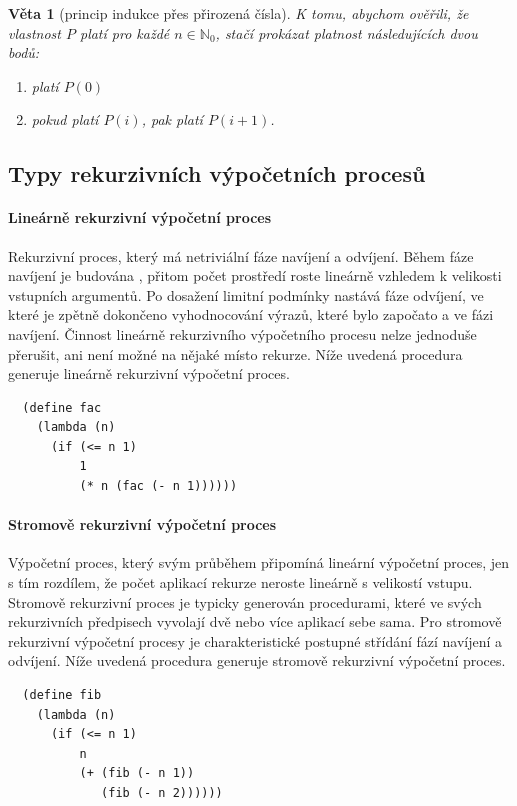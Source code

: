 \documentclass[10pt,a4paper]{article}
\newtheorem{veta}{Věta}
\begin{document}
    \begin{veta}[princip indukce přes přirozená čísla]
      K tomu, abychom ověřili, že vlastnost $P$ platí pro každé $n\in \mathbb{N}_0$, stačí prokázat platnost následujících dvou bodů:
      \begin{enumerate}
        \item platí $P(0)$
        \item pokud platí $P(i)$, pak platí $P(i+1)$.
      \end{enumerate}
    \end{veta}
  \subsection{Typy rekurzivních výpočetních procesů}
    \paragraph{Lineárně rekurzivní výpočetní proces}
      Rekurzivní proces, který má netriviální fáze navíjení a odvíjení. Během fáze navíjení je budována , přitom počet prostředí roste lineárně vzhledem k velikosti vstupních argumentů. Po dosažení limitní podmínky nastává fáze odvíjení, ve které je zpětně dokončeno vyhodnocování výrazů, které bylo započato a  ve fázi navíjení. Činnost lineárně rekurzivního výpočetního procesu nelze jednoduše přerušit, ani není možné  na nějaké místo rekurze. Níže uvedená procedura generuje lineárně rekurzivní výpočetní proces.
      \begin{verbatim}
  (define fac
    (lambda (n)
      (if (<= n 1)
          1
          (* n (fac (- n 1))))))
      \end{verbatim}
    \paragraph{Stromově rekurzivní výpočetní proces}
      Výpočetní proces, který svým průběhem připomíná lineární výpočetní proces, jen s tím rozdílem, že počet aplikací rekurze neroste lineárně s velikostí vstupu. Stromově rekurzivní proces je typicky generován procedurami, které ve svých rekurzivních předpisech vyvolají dvě nebo více aplikací sebe sama. Pro stromově rekurzivní výpočetní procesy je charakteristické postupné střídání fází navíjení a odvíjení. Níže uvedená procedura generuje stromově rekurzivní výpočetní proces.
      \begin{verbatim}
  (define fib
    (lambda (n)
      (if (<= n 1)
          n
          (+ (fib (- n 1))
             (fib (- n 2))))))
      \end{verbatim}
\end{document}
